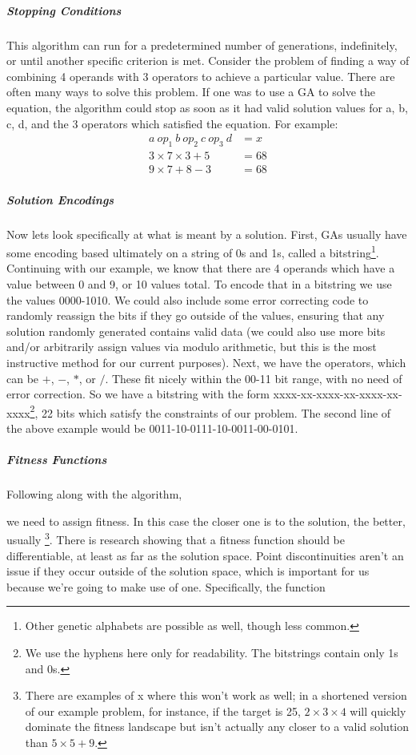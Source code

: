\subparagraph{Stopping Conditions} This algorithm can run for a predetermined number of generations, indefinitely, or until another specific criterion is met.  Consider the problem of finding a way of combining 4 operands with 3 operators to achieve a particular value.  There are often many ways to solve this problem.  If one was to use a GA to solve the equation, the algorithm could stop as soon as it had valid solution values for a, b, c, d, and the 3 operators which satisfied the equation.  For example:
\begin{align*}
		a \: op_1\: b\: op_2\: c\: op_3\: d &= x\\
		3 \times 7 \times 3 + 5 &= 68\\
		9 \times 7 + 8-3 &= 68
\end{align*}
\subparagraph{Solution Encodings}
Now lets look specifically at what is meant by a solution.  First, GAs usually have some encoding based ultimately on a string of 0s and 1s, called a bitstring\footnote{Other genetic alphabets are possible as well, though less common.}. Continuing with our example, we know that there are 4 operands which have a value between 0 and 9, or 10 values total.  To encode that in a bitstring we use the values 0000-1010.  We could also include some error correcting code to randomly reassign the bits if they go outside of the values, ensuring that any solution randomly generated contains valid data (we could also use more bits and/or arbitrarily assign values via modulo arithmetic, but this is the most instructive method for our current purposes).  Next, we have the operators, which can be $+$, $-$, $*$, or $/$.  These fit nicely within the 00-11 bit range, with no need of error correction.  So we have a bitstring with the form xxxx-xx-xxxx-xx-xxxx-xx-xxxx\footnote{We use the hyphens here only for readability.  The bitstrings contain only 1s and 0s.}, 22 bits which satisfy the constraints of our problem. The second line of the above example would be 0011-10-0111-10-0011-00-0101.
\subparagraph{Fitness Functions}
Following along with the algorithm,\begin{flushleft}
	
\end{flushleft} we need to assign fitness.  In this case the closer one is to the solution, the better, usually \footnote{There are examples of x where this won't work as well; in a shortened version of our example problem, for instance, if the target is 25, $2\times3\times4$ will quickly dominate the fitness landscape but isn't actually any closer to a valid solution than $5\times5+9$.}.  There is research showing that a fitness function should be differentiable, at least as far as the solution space.  Point discontinuities aren't an issue if they occur outside of the solution space, which is important for us because we're going to make use of one. Specifically, the function 
